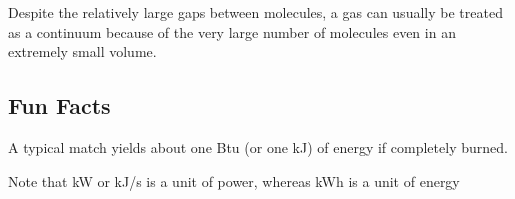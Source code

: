 \begin{ennumerate}
Despite the relatively large gaps between molecules, a gas can usually be treated as a continuum because of the very large number of molecules even in an extremely small volume.

\end{ennumerate}

\subsection{Fun Facts}
A typical match yields about one Btu (or one kJ) of energy if completely burned.

Note that kW or kJ/s is a unit of power, whereas kWh is a unit of energy
